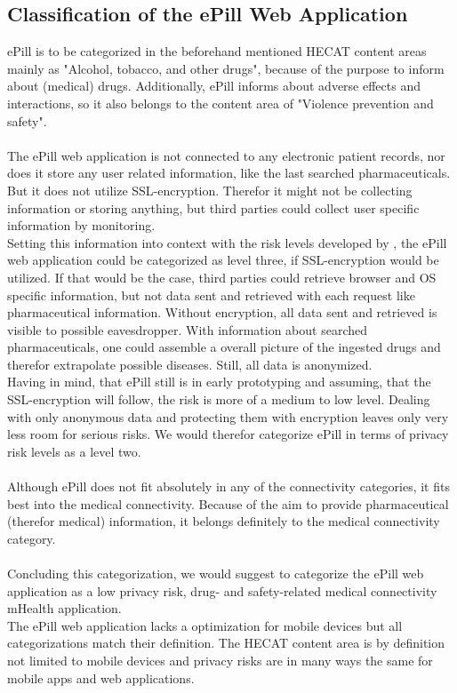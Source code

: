 \subsection{Classification of the ePill Web Application}
ePill is to be categorized in the beforehand mentioned HECAT content areas mainly as "Alcohol, tobacco, and other drugs", because of the purpose to inform about (medical) drugs. Additionally, ePill informs about adverse effects and interactions, so it also belongs to the content area of "Violence prevention and safety".
\\
\\
The ePill web application is not connected to any electronic patient records, nor does it store any user related information, like the last searched pharmaceuticals. But it does not utilize SSL-encryption. Therefor it might not be collecting information or storing anything, but third parties could collect user specific information by monitoring.
\\
Setting this information into context with the risk levels developed by \cite{Njie.2013}, the ePill web application could be categorized as level three, if SSL-encryption would be utilized. If that would be the case, third parties could retrieve browser and OS specific information, but not data sent and retrieved with each request like pharmaceutical information. Without encryption, all data sent and retrieved is visible to possible eavesdropper. With information about searched pharmaceuticals, one could assemble a overall picture of the ingested drugs and therefor extrapolate possible diseases. Still, all data is anonymized.
\\
Having in mind, that ePill still is in early prototyping and assuming, that the SSL-encryption will follow, the risk is more of a medium to low level. Dealing with only anonymous data and protecting them with encryption leaves only very less room for serious risks. We would therefor categorize ePill in terms of privacy risk levels as a level two.
\\
\\
Although ePill does not fit absolutely in any of the connectivity categories, it fits best into the medical connectivity. Because of the aim to provide pharmaceutical (therefor medical) information, it belongs definitely to the medical connectivity category.
\\
\\
Concluding this categorization, we would suggest to categorize the ePill web application as a low privacy risk, drug- and safety-related medical connectivity mHealth application.
\\
The ePill web application lacks a optimization for mobile devices but all categorizations match their definition. The HECAT content area is by definition not limited to mobile devices and privacy risks are in many ways the same for mobile apps and web applications.

